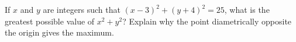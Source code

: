 If $x$ and $y$ are integers such that $(x-3)^2+(y+4)^2=25$, what is the greatest possible value of $x^2+y^2$? Explain why the point diametrically opposite the origin gives the maximum.
